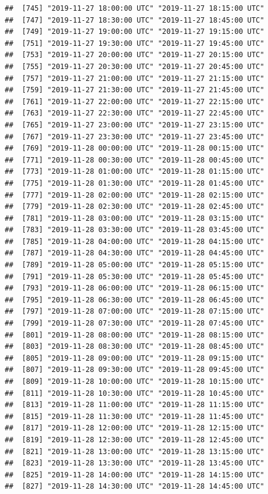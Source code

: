 \documentclass{article}\usepackage[]{graphicx}\usepackage[]{color}
\makeatletter
\newenvironment{kframe}{%
 \def\at@end@of@kframe{}%
 \ifinner\ifhmode%
  \def\at@end@of@kframe{\end{minipage}}%
  \begin{minipage}{\columnwidth}%
 \fi\fi%
 \def\FrameCommand##1{\hskip\@totalleftmargin \hskip-\fboxsep
 \colorbox{shadecolor}{##1}\hskip-\fboxsep
     \hskip-\linewidth \hskip-\@totalleftmargin \hskip\columnwidth}%
 \MakeFramed {\advance\hsize-\width
   \@totalleftmargin\z@ \linewidth\hsize
   \@setminipage}}%
 {\par\unskip\endMakeFramed%
 \at@end@of@kframe}
\newenvironment{knitrout}{}{} %
\makeatother
\begin{document}
\begin{knitrout}
\begin{kframe}
\begin{verbatim}
##  [745] "2019-11-27 18:00:00 UTC" "2019-11-27 18:15:00 UTC"
##  [747] "2019-11-27 18:30:00 UTC" "2019-11-27 18:45:00 UTC"
##  [749] "2019-11-27 19:00:00 UTC" "2019-11-27 19:15:00 UTC"
##  [751] "2019-11-27 19:30:00 UTC" "2019-11-27 19:45:00 UTC"
##  [753] "2019-11-27 20:00:00 UTC" "2019-11-27 20:15:00 UTC"
##  [755] "2019-11-27 20:30:00 UTC" "2019-11-27 20:45:00 UTC"
##  [757] "2019-11-27 21:00:00 UTC" "2019-11-27 21:15:00 UTC"
##  [759] "2019-11-27 21:30:00 UTC" "2019-11-27 21:45:00 UTC"
##  [761] "2019-11-27 22:00:00 UTC" "2019-11-27 22:15:00 UTC"
##  [763] "2019-11-27 22:30:00 UTC" "2019-11-27 22:45:00 UTC"
##  [765] "2019-11-27 23:00:00 UTC" "2019-11-27 23:15:00 UTC"
##  [767] "2019-11-27 23:30:00 UTC" "2019-11-27 23:45:00 UTC"
##  [769] "2019-11-28 00:00:00 UTC" "2019-11-28 00:15:00 UTC"
##  [771] "2019-11-28 00:30:00 UTC" "2019-11-28 00:45:00 UTC"
##  [773] "2019-11-28 01:00:00 UTC" "2019-11-28 01:15:00 UTC"
##  [775] "2019-11-28 01:30:00 UTC" "2019-11-28 01:45:00 UTC"
##  [777] "2019-11-28 02:00:00 UTC" "2019-11-28 02:15:00 UTC"
##  [779] "2019-11-28 02:30:00 UTC" "2019-11-28 02:45:00 UTC"
##  [781] "2019-11-28 03:00:00 UTC" "2019-11-28 03:15:00 UTC"
##  [783] "2019-11-28 03:30:00 UTC" "2019-11-28 03:45:00 UTC"
##  [785] "2019-11-28 04:00:00 UTC" "2019-11-28 04:15:00 UTC"
##  [787] "2019-11-28 04:30:00 UTC" "2019-11-28 04:45:00 UTC"
##  [789] "2019-11-28 05:00:00 UTC" "2019-11-28 05:15:00 UTC"
##  [791] "2019-11-28 05:30:00 UTC" "2019-11-28 05:45:00 UTC"
##  [793] "2019-11-28 06:00:00 UTC" "2019-11-28 06:15:00 UTC"
##  [795] "2019-11-28 06:30:00 UTC" "2019-11-28 06:45:00 UTC"
##  [797] "2019-11-28 07:00:00 UTC" "2019-11-28 07:15:00 UTC"
##  [799] "2019-11-28 07:30:00 UTC" "2019-11-28 07:45:00 UTC"
##  [801] "2019-11-28 08:00:00 UTC" "2019-11-28 08:15:00 UTC"
##  [803] "2019-11-28 08:30:00 UTC" "2019-11-28 08:45:00 UTC"
##  [805] "2019-11-28 09:00:00 UTC" "2019-11-28 09:15:00 UTC"
##  [807] "2019-11-28 09:30:00 UTC" "2019-11-28 09:45:00 UTC"
##  [809] "2019-11-28 10:00:00 UTC" "2019-11-28 10:15:00 UTC"
##  [811] "2019-11-28 10:30:00 UTC" "2019-11-28 10:45:00 UTC"
##  [813] "2019-11-28 11:00:00 UTC" "2019-11-28 11:15:00 UTC"
##  [815] "2019-11-28 11:30:00 UTC" "2019-11-28 11:45:00 UTC"
##  [817] "2019-11-28 12:00:00 UTC" "2019-11-28 12:15:00 UTC"
##  [819] "2019-11-28 12:30:00 UTC" "2019-11-28 12:45:00 UTC"
##  [821] "2019-11-28 13:00:00 UTC" "2019-11-28 13:15:00 UTC"
##  [823] "2019-11-28 13:30:00 UTC" "2019-11-28 13:45:00 UTC"
##  [825] "2019-11-28 14:00:00 UTC" "2019-11-28 14:15:00 UTC"
##  [827] "2019-11-28 14:30:00 UTC" "2019-11-28 14:45:00 UTC"

\end{verbatim}
\end{kframe}
\end{knitrout}
\end{document}
